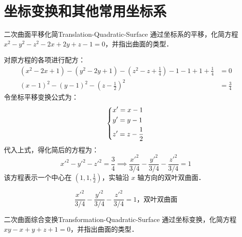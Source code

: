 \section{坐标变换和其他常用坐标系}

\begin{problem}{二次曲面平移化简}{Translation-Quadratic-Surface}
    通过坐标系的平移，化简方程 $x^2 - y^2 - z^2 - 2x + 2y + z - 1 = 0$，并指出曲面的类型．
\end{problem}

\begin{solution}
    对原方程的各项进行配方：
    \begin{equation}
        \begin{aligned}
            (x^2 - 2x + 1) - (y^2 - 2y + 1) - \left( z^2 - z + \frac{1}{4} \right) - 1 - 1 + 1 + \frac{1}{4} & = 0           \\
            (x - 1)^2 - (y - 1)^2 - \left( z - \frac{1}{2} \right)^2                                         & = \frac{3}{4}
        \end{aligned}
    \end{equation}
    令坐标平移变换公式为：
    \begin{equation}
        \begin{dcases}
            x' = x - 1 \\
            y' = y - 1 \\
            z' = z - \frac{1}{2}
        \end{dcases}
    \end{equation}
    代入上式，得化简后的方程为：
    \begin{equation}
        x'^2 - y'^2 - z'^2 = \frac{3}{4} \implies \frac{x'^2}{3/4} - \frac{y'^2}{3/4} - \frac{z'^2}{3/4} = 1
    \end{equation}
    该方程表示一个中心在 $\left( 1, 1, \frac{1}{2} \right)$，实轴沿 $x$ 轴方向的双叶双曲面．

    \begin{equation}
        \boxed{\frac{x'^2}{3/4} - \frac{y'^2}{3/4} - \frac{z'^2}{3/4} = 1，\text{双叶双曲面}}
    \end{equation}
\end{solution}

\begin{problem}{二次曲面综合变换}{Transformation-Quadratic-Surface}
    通过坐标变换，化简方程 $xy - x + y + z + 1 = 0$，并指出曲面的类型．
\end{problem}

